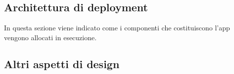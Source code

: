 \subsection{Architettura di deployment}

In questa sezione viene indicato come i componenti che costituiscono l'app vengono allocati in esecuzione.






\subsection{Altri aspetti di design}
























